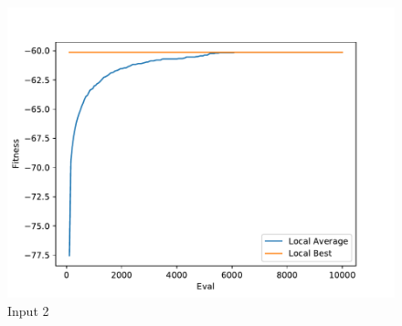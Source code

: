 \documentclass{standalone}
\begin{document}
\begin{figure}[!htb]
	\caption{Input 2}
	\label{fig:graph_2005}
	\includegraphics[width=\textwidth]{../graphs/graphs/2005.pdf}
\end{figure}
\end{document}
